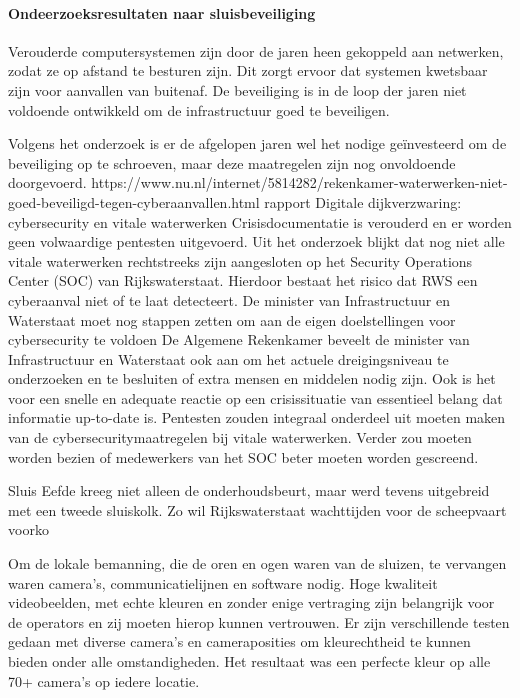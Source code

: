 \paragraph{Ondeerzoeksresultaten naar sluisbeveiliging}



Verouderde computersystemen zijn door de jaren heen gekoppeld aan netwerken, zodat ze op afstand te besturen zijn. Dit zorgt ervoor dat systemen kwetsbaar zijn voor aanvallen van buitenaf. De beveiliging is in de loop der jaren niet voldoende ontwikkeld om de infrastructuur goed te beveiligen.

Volgens het onderzoek is er de afgelopen jaren wel het nodige geïnvesteerd om de beveiliging op te schroeven, maar deze maatregelen zijn nog onvoldoende doorgevoerd.
https://www.nu.nl/internet/5814282/rekenkamer-waterwerken-niet-goed-beveiligd-tegen-cyberaanvallen.html
\cite{hdsr30092022lichtprojectieswaterliniesluizen}
rapport Digitale dijkverzwaring: cybersecurity en vitale waterwerken 
Crisisdocumentatie is verouderd en er worden geen volwaardige pentesten uitgevoerd. Uit het onderzoek blijkt dat nog niet alle vitale waterwerken rechtstreeks zijn aangesloten op het Security Operations Center (SOC) van Rijkswaterstaat. Hierdoor bestaat het risico dat RWS een cyberaanval niet of te laat detecteert. De minister van Infrastructuur en Waterstaat moet nog stappen zetten om aan de eigen doelstellingen voor cybersecurity te voldoen
De Algemene Rekenkamer beveelt de minister van Infrastructuur en Waterstaat ook aan om het actuele dreigingsniveau te onderzoeken en te besluiten of extra mensen en middelen nodig zijn. Ook is het voor een snelle en adequate reactie op een crisissituatie van essentieel belang dat informatie up-to-date is. Pentesten zouden integraal onderdeel uit moeten maken van de cybersecuritymaatregelen bij vitale waterwerken. Verder zou moeten worden bezien of medewerkers van het SOC beter moeten worden gescreend.

\cite{kramerZeeland}
Sluis Eefde kreeg niet alleen de onderhoudsbeurt, maar werd tevens uitgebreid met een tweede sluiskolk. Zo wil Rijkswaterstaat wachttijden voor de scheepvaart voorko

\cite{gww29032021kantelendesluisdeur}
Om de lokale bemanning, die de oren en ogen waren van de sluizen, te vervangen waren camera’s, communicatielijnen en software nodig. Hoge kwaliteit videobeelden, met echte kleuren en zonder enige vertraging zijn belangrijk voor de operators en zij moeten hierop kunnen vertrouwen. Er zijn verschillende testen gedaan met diverse camera’s en cameraposities om kleurechtheid te kunnen bieden onder alle omstandigheden. Het resultaat was een perfecte kleur op alle 70+ camera’s op iedere locatie.

